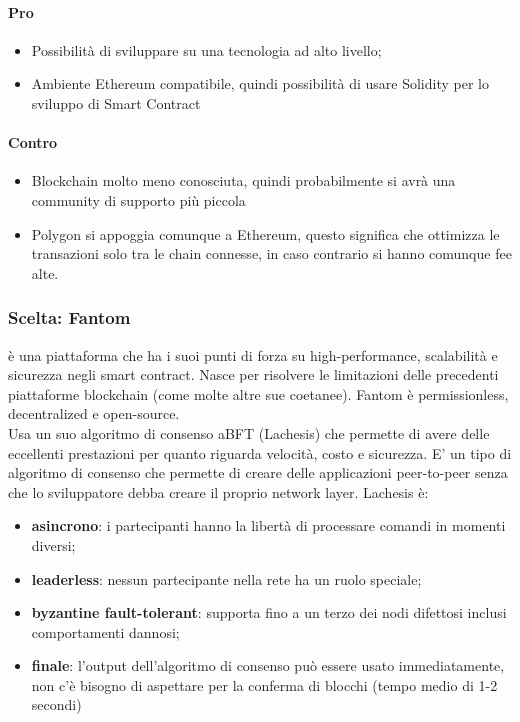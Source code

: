     \paragraph{Pro}
    \begin{itemize}
        \item Possibilità di sviluppare su una tecnologia ad alto livello;
        \item Ambiente Ethereum compatibile, quindi possibilità di usare Solidity per lo sviluppo di Smart Contract
    \end{itemize}
    \paragraph{Contro}
    \begin{itemize}
        \item Blockchain molto meno conosciuta, quindi probabilmente si avrà una community di supporto più piccola
        \item Polygon si appoggia comunque a Ethereum, questo significa che ottimizza le transazioni solo tra le chain connesse, in caso contrario si hanno comunque fee alte.
    \end{itemize}

    \subsubsection{Scelta: Fantom}
    è una piattaforma che ha i suoi punti di forza su high-performance, scalabilità e sicurezza negli smart contract. Nasce per risolvere le limitazioni delle precedenti piattaforme blockchain (come molte altre sue coetanee).
    Fantom è permissionless, decentralized e open-source.\\
    Usa un suo algoritmo di consenso aBFT (Lachesis) che permette di avere delle eccellenti prestazioni per quanto riguarda velocità, costo e sicurezza.
    E’ un tipo di algoritmo di consenso che permette di creare delle applicazioni peer-to-peer senza che lo sviluppatore debba creare il proprio network layer. Lachesis è:
    \begin{itemize}
        \item \textbf{asincrono}: i partecipanti hanno la libertà di processare comandi in momenti diversi;
        \item \textbf{leaderless}: nessun partecipante nella rete ha un ruolo speciale;
        \item \textbf{byzantine fault-tolerant}: supporta fino a un terzo dei nodi difettosi inclusi comportamenti dannosi; 
        \item \textbf{finale}: l’output dell’algoritmo di consenso può essere usato immediatamente, non c’è bisogno di aspettare per la conferma di blocchi (tempo medio di 1-2 secondi)
    \end{itemize}
    
